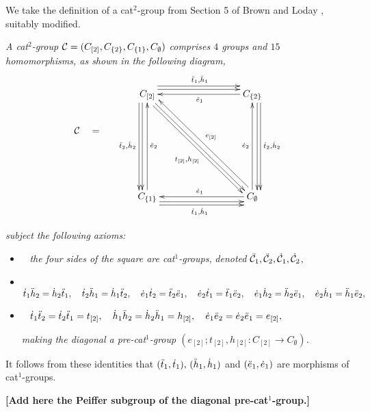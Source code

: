 We take the definition of a cat$^2$-group from 
Section 5 of Brown and Loday \cite{brow:lod}, suitably modified.

\begin{defn}
\emph{A cat$^2$-group  $\mathcal{C} = (C_{[2]},C_{\{2\}},C_{\{1\}},C_{\emptyset})$  
comprises $4$ groups and $15$ homomorphisms,
as shown in the following diagram,}
\begin{equation} \label{eq:cat2-diag}
\vcenter{\xymatrix{
 & C_{[2]} \ar[ddd] <-1.2ex>  \ar[ddd] <-2.0ex>_{\ddttt,\ddhht}
     \ar[rrr] <+1.2ex>  \ar[rrr] <+2.0ex>^{\ddtto,\ddhho}
     \ar[dddrrr] <-0.2ex>  \ar[dddrrr] <-1.0ex>_(0.55){\ttot,\hhot}
    &&&  C_{\{2\}}  \ar[lll]^{\ddeeo}
            \ar[ddd]<+1.2ex>  \ar[ddd] <+2.0ex>^{\dttt,\dhht}  \\
\calC \quad = \quad
 &  &&&   \\
 &  &&&   \\
 & C_{\{1\}} \ar[uuu]_{\ddeet}
     \ar[rrr] <-1.2ex>  \ar[rrr] <-2.0ex>_{\dtto,\dhho} 
    &&&  C_{\emptyset} \ar[uuu]^{\deet}   \ar[lll]_{\deeo} 
           \ar[uuulll] <-1.0ex>_{\eeot}
 \\
}}
\end{equation}

\noindent
\emph{subject the following axioms:}
\begin{itemize}
\item~
\emph{the four sides of the square are cat$^1$-groups,}
\emph{denoted} $\ddot{\mathcal{C}}_1, \ddot{\mathcal{C}}_2, \dot{\mathcal{C}}_1, \dot{\mathcal{C}}_2$,
\item~
$
 \dot{t}_1\ddot{h}_2 = \dot{h}_2\ddot{t}_1, \quad
 \dot{t}_2\ddot{h}_1 = \dot{h}_1\ddot{t}_2, \quad
 \dot{e}_1\dot{t}_2 = \ddot{t}_2\ddot{e}_1, \quad
 \dot{e}_2\dot{t}_1 = \ddot{t}_1\ddot{e}_2, \quad
 \dot{e}_1\dot{h}_2 = \ddot{h}_2\ddot{e}_1, \quad
 \dot{e}_2\dot{h}_1 = \ddot{h}_1\ddot{e}_2,$
\item~
$\dot{t}_1\ddot{t}_2 = \dot{t}_2\ddot{t}_1 = t_{[2]}, \quad 
 \dot{h}_1\ddot{h}_2 = \dot{h}_2\ddot{h}_1 = h_{[2]}, \quad
 \dot{e}_1\ddot{e}_2 = \dot{e}_2\ddot{e}_1 = e_{[2]},$

\emph{making the diagonal a pre-cat$^1$-group
$(e_{[2]}; t_{[2]}, h_{[2]} : C_{[2]} \to C_{\emptyset})$.}
\end{itemize}
\end{defn}

\noindent
It follows from these identities that 
$(\ddot{t}_1,\dot{t}_1),\,(\ddot{h}_1,\dot{h}_1)$ and $(\ddot{e}_1,\dot{e}_1)$ 
are morphisms of cat$^1$-groups.

\bigskip\noindent
{\bf [Add here the Peiffer subgroup of the diagonal pre-cat$^1$-group.]}


\newpage
